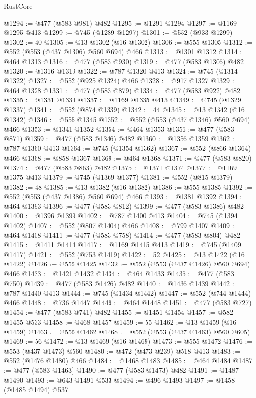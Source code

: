 \begin{lexlean}{RustCore}
\begin{coremodule}
@1294 := @477 (@583 @981) @482
@1295 := @1291 @1294
@1297 := @1169 @1295 @413
@1299 := @745 (@1289 @1297)
@1301 := @552 (@933 @1299)
@1302 := 40
@1305 := @13 @1302 (@16 @1302)
@1306 := @555 @1305
@1312 := @552 (@553 (@437 @1306) @560 @694) @466
@1313 := @1301 @1312
@1314 := @464 @1313
@1316 := @477 (@583 @930)
@1319 := @477 (@583 @1306) @482
@1320 := @1316 @1319
@1322 := @787 @1320 @413
@1324 := @745 (@1314 @1322)
@1327 := @552 (@925 @1324) @466
@1328 := @917 @1327
@1329 := @464 @1328
@1331 := @477 (@583 @879)
@1334 := @477 (@583 @922) @482
@1335 := @1331 @1334
@1337 := @1169 @1335 @413
@1339 := @745 (@1329 @1337)
@1341 := @552 (@874 @1339)
@1342 := 44
@1345 := @13 @1342 (@16 @1342)
@1346 := @555 @1345
@1352 := @552 (@553 (@437 @1346) @560 @694) @466
@1353 := @1341 @1352
@1354 := @464 @1353
@1356 := @477 (@583 @871)
@1359 := @477 (@583 @1346) @482
@1360 := @1356 @1359
@1362 := @787 @1360 @413
@1364 := @745 (@1354 @1362)
@1367 := @552 (@866 @1364) @466
@1368 := @858 @1367
@1369 := @464 @1368
@1371 := @477 (@583 @820)
@1374 := @477 (@583 @863) @482
@1375 := @1371 @1374
@1377 := @1169 @1375 @413
@1379 := @745 (@1369 @1377)
@1381 := @552 (@815 @1379)
@1382 := 48
@1385 := @13 @1382 (@16 @1382)
@1386 := @555 @1385
@1392 := @552 (@553 (@437 @1386) @560 @694) @466
@1393 := @1381 @1392
@1394 := @464 @1393
@1396 := @477 (@583 @812)
@1399 := @477 (@583 @1386) @482
@1400 := @1396 @1399
@1402 := @787 @1400 @413
@1404 := @745 (@1394 @1402)
@1407 := @552 (@807 @1404) @466
@1408 := @799 @1407
@1409 := @464 @1408
@1411 := @477 (@583 @758)
@1414 := @477 (@583 @804) @482
@1415 := @1411 @1414
@1417 := @1169 @1415 @413
@1419 := @745 (@1409 @1417)
@1421 := @552 (@753 @1419)
@1422 := 52
@1425 := @13 @1422 (@16 @1422)
@1426 := @555 @1425
@1432 := @552 (@553 (@437 @1426) @560 @694) @466
@1433 := @1421 @1432
@1434 := @464 @1433
@1436 := @477 (@583 @750)
@1439 := @477 (@583 @1426) @482
@1440 := @1436 @1439
@1442 := @787 @1440 @413
@1444 := @745 (@1434 @1442)
@1447 := @552 (@744 @1444) @466
@1448 := @736 @1447
@1449 := @464 @1448
@1451 := @477 (@583 @727)
@1454 := @477 (@583 @741) @482
@1455 := @1451 @1454
@1457 := @582 @1455 @533
@1458 := @468 @1457
@1459 := 55
@1462 := @13 @1459 (@16 @1459)
@1463 := @555 @1462
@1468 := @552 (@553 (@437 @1463) @560 @605)
@1469 := 56
@1472 := @13 @1469 (@16 @1469)
@1473 := @555 @1472
@1476 := @553 (@437 @1473) @560
@1480 := @472 (@473 @239) @518 @413
@1483 := @552 (@1476 @1480) @466
@1484 := @1468 @1483
@1485 := @464 @1484
@1487 := @477 (@583 @1463)
@1490 := @477 (@583 @1473) @482
@1491 := @1487 @1490
@1493 := @643 @1491 @533
@1494 := @496 @1493
@1497 := @1458 (@1485 @1494) @537

\end{coremodule}
\end{lexlean}
